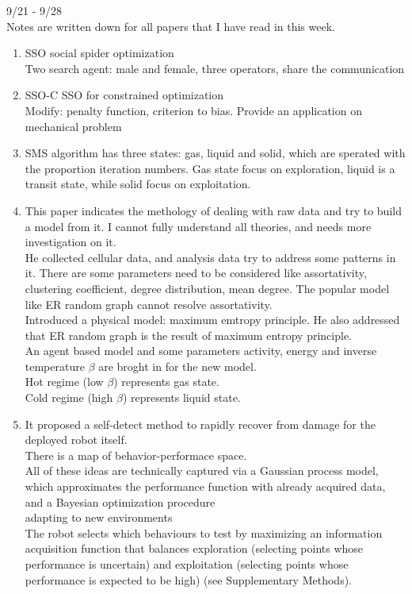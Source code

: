 \documentclass[a4paper,12pt]{article}
\begin{document}
9/21 - 9/28
\\Notes are written down for all papers that I have read in this week. 
\begin{enumerate}
	\item SSO social spider optimization\cite{Cuevas_A_2013}
	\\Two search agent: male and female, three operators, share the communication
	
	\item SSO-C SSO for constrained optimization\cite{Cuevas_A_2014}
	\\Modify: penalty function, criterion to bias. Provide an application on mechanical problem
	
	\item SMS algorithm\cite{Cuevas_An_2014} has three states: gas, liquid and solid, which are sperated with the proportion iteration numbers. Gas state focus on exploration, liquid is a transit state, while solid focus on exploitation.
	
	\item This paper \cite{Anthony_Ap_2013} indicates the methology of dealing with raw data and try to build a model from it. I cannot fully understand all theories, and needs more investigation on it.
	\\He collected cellular data, and analysis data try to address some patterns in it. There are some parameters need to be considered like assortativity, clustering coefficient,  degree distribution,  mean degree. The popular model like ER random graph cannot resolve assortativity.
	\\Introduced a  physical model: maximum emtropy principle. He also addressed that ER random graph is the result of maximum entropy principle.
	\\An agent based model and some parameters activity, energy and inverse temperature  \(\beta\) are broght in for the new model.
	\\Hot regime (low \(\beta\)) represents gas state.
	\\Cold regime (high \(\beta\)) represents liquid state.
	
	\item It proposed a self-detect method to rapidly recover from damage for the deployed robot itself. \cite{Cully_Robots_2015}
	\\There is a map of behavior-performace space.
	\\All of these ideas are technically captured via a Gaussian process model, which approximates the performance function with already acquired data, and a Bayesian optimization procedure
	\\ adapting to new environments
	\\The robot selects which behaviours to test by maximizing an information acquisition function that balances exploration (selecting points whose performance is uncertain) and exploitation (selecting points whose performance is expected to be high) (see Supplementary Methods). 
	

\end{enumerate}
\end{document}
